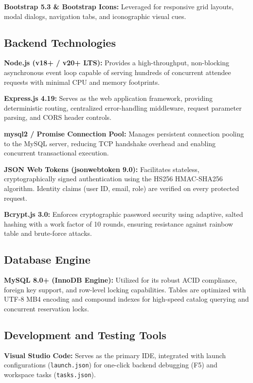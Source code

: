 \documentclass[11pt,a4paper]{article}
\begin{document}
\textbf{Bootstrap 5.3 \& Bootstrap Icons:} Leveraged for responsive grid layouts, modal dialogs, navigation tabs, and iconographic visual cues.

\subsection*{Backend Technologies}
\justifying

\textbf{Node.js (v18+ / v20+ LTS):} Provides a high-throughput, non-blocking asynchronous event loop capable of serving hundreds of concurrent attendee requests with minimal CPU and memory footprints.

\textbf{Express.js 4.19:} Serves as the web application framework, providing deterministic routing, centralized error-handling middleware, request parameter parsing, and CORS header controls.

\textbf{mysql2 / Promise Connection Pool:} Manages persistent connection pooling to the MySQL server, reducing TCP handshake overhead and enabling concurrent transactional execution.

\textbf{JSON Web Tokens (jsonwebtoken 9.0):} Facilitates stateless, cryptographically signed authentication using the HS256 HMAC-SHA256 algorithm. Identity claims (user ID, email, role) are verified on every protected request.

\textbf{Bcrypt.js 3.0:} Enforces cryptographic password security using adaptive, salted hashing with a work factor of 10 rounds, ensuring resistance against rainbow table and brute-force attacks.

\subsection*{Database Engine}
\justifying

\textbf{MySQL 8.0+ (InnoDB Engine):} Utilized for its robust ACID compliance, foreign key support, and row-level locking capabilities. Tables are optimized with UTF-8 MB4 encoding and compound indexes for high-speed catalog querying and concurrent reservation locks.

\subsection*{Development and Testing Tools}
\justifying

\textbf{Visual Studio Code:} Serves as the primary IDE, integrated with launch configurations (\texttt{launch.json}) for one-click backend debugging (F5) and workspace tasks (\texttt{tasks.json}).
\end{document}
